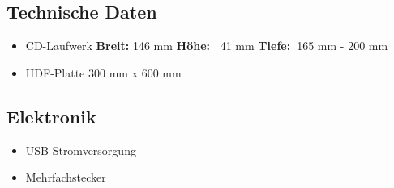 \documentclass[10pt,a4paper]{scrartcl}%
\def\inch#1{#1''}
\begin{document}
\subsection{Technische Daten}
\begin{itemize}
\item CD-Laufwerk \textbf{Breit: } 146 mm \textbf{Höhe:\ } 41 mm \textbf{Tiefe:\ }165 mm - 200 mm 
\item HDF-Platte 300 mm x 600 mm
\end{itemize}
\subsection{Elektronik}
\begin{itemize}
\item USB-Stromversorgung
\item Mehrfachstecker
\end{itemize}

\end{document}
